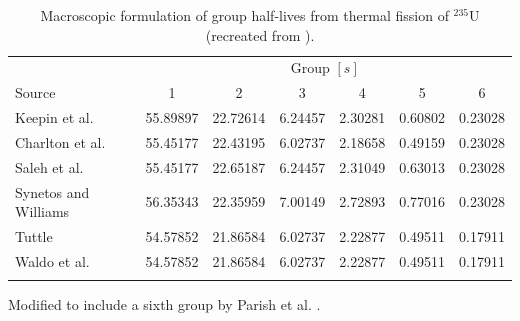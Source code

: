 \begin{table}[!h]
\centering
\begin{threeparttable}
\caption{Macroscopic formulation of group half-lives from thermal fission of $^{235}$U (recreated from \cite{parish1999status}).}
\begin{tabular}{lcccccc}
\hline
 & \multicolumn{6}{c}{Group $[s]$} \\
Source & 1 & 2 & 3 & 4 & 5 & 6 \\
\hline
Keepin et al. \cite{keepin1957delayed}   & 55.89897 & 22.72614 & 6.24457 & 2.30281 & 0.60802 & 0.23028 \\
Charlton et al. \cite{charlton1996delayed}\tnote{*} & 55.45177 & 22.43195 & 6.02737 & 2.18658 & 0.49159 & 0.23028 \\
Saleh et al. \cite{saleh1997measurements} & 55.45177 & 22.65187 & 6.24457 & 2.31049 & 0.63013 & 0.23028 \\
Synetos and Williams \cite{synetos1983delayed}\tnote{*} & 56.35343 & 22.35959 & 7.00149 & 2.72893 & 0.77016 & 0.23028 \\
Tuttle \cite{tuttle1975delayed}    & 54.57852 & 21.86584 & 6.02737 & 2.22877 & 0.49511 & 0.17911 \\
Waldo et al.\cite{waldo1981delayed}    & 54.57852 & 21.86584 & 6.02737 & 2.22877 & 0.49511 & 0.17911 \\
\hline
\label{tab:macro-half-lives}
\end{tabular}
\begin{tablenotes}
\item[*] Modified to include a sixth group by Parish et al. \cite{parish1999status}.
\end{tablenotes}
\end{threeparttable}
\end{table}

